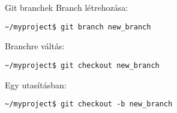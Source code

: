 
\begin{frame}[fragile]{Git branchek}
    \pause
    Branch létrehozása:
\small\begin{verbatim}
~/myproject$ git branch new_branch
\end{verbatim}\normalsize

    \pause
    Branchre váltás:
\small\begin{verbatim}
~/myproject$ git checkout new_branch
\end{verbatim}\normalsize

    \pause
    Egy utasításban:
\small\begin{verbatim}
~/myproject$ git checkout -b new_branch
\end{verbatim}\normalsize
\end{frame}

